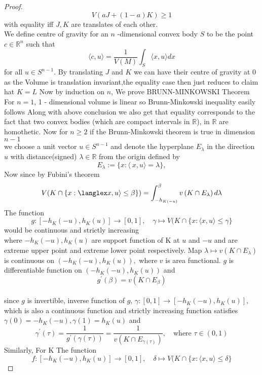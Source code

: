 \documentclass[oneside]{book}
\theoremstyle{definition}
\begin{document}
\begin{proof}
\[
V(a J+(1-a) K) \geq 1
\]
with equality iff $J, K$ are translates of each other.
\\
 We define centre of gravity for an $n$ -dimensional convex body $S$ to be the point $c \in \mathbb{R}^{n}$ such that
\[
\langle c, u\rangle=\frac{1}{V(M)} \int_{S}\langle x, u\rangle d x
\]
for all $u \in S^{n-1} .$ \newpage
By translating  $J$ and $K$ we can have their centre of gravity at 0 as the Volume is translation invariant,the equality case then just reduces to claim hat $K=L$
\hfill \break
Now by induction on $n$, We prove  BRUNN-MINKOWSKI Theorem 
\hfill \break
For $n=1$, 1 - dimensional volume is linear so Brunn-Minkowski inequality easily follows 
\hfill \break 
Along with above conclusion we also get that equality corresponds to the fact that two convex bodies (which are compact intervals in $\mathbb{R}$), in $\mathbb{R}$  are homothetic.
\hfill \break 
Now for $n \geq 2$ if the Brunn-Minkowski theorem is true in dimension $n-1 $
\\
we choose a unit vector $u \in S^{n-1}$ and denote 
the hyperplane $E_{\lambda}$ in the direction $u$ with  distance(signed) $\lambda \in \mathbb{R} $ from the origin defined by 
\[
E_{\lambda}:=\{x:\langle\ x, u\rangle=\lambda\}, 
\]
Now since by Fubini's theorem  
\[
V(K \cap\{x: \langlex x, u\rangle \leq \beta\})=\int_{-h_{ K(-u)}}^{\beta} v\left(K \cap E_{\lambda}\right) d \lambda
\] 
The function
\[
g:\left[-h_{K}(-u), h_{K}(u)\right] \rightarrow[0,1], \quad \gamma \mapsto V(K \cap\{x:\langle x, u\rangle \leq  \gamma \}
\]
would be  continuous and strictly increasing\\
where $-h_{K}(-u), h_{K}(u)$ are support function of K at $u$ and $-u$ and are extreme upper point and extreme lower point respectively.
\hfill \break
  Map $\lambda \mapsto v\left(K \cap E_{\lambda}\right)$ is continuous on $\left(-h_{K}(-u), h_{K}(u)\right),$ where $v$ is area functional.
   $g$ is differentiable function on $\left(-h_{K}(-u), h_{K}(u)\right)$ and $$g^{\prime}(\beta)=v\left(K \cap E_{\beta}\right)$$
  \\
  since $g$ is invertible, inverse function of $g$, $ \gamma:[0,1] \rightarrow\left[-h_{K}(-u), h_{K}(u)\right],$ which is also a continuous function and strictly increasing  function satisfies $ \gamma(0)=-h_{K}(-u),  \gamma(1)=h_{K}(u)$ and
\[
 \gamma^{\prime}(\tau)=\frac{1}{g^{\prime}( \gamma(\tau))}=\frac{1}{v\left(K \cap E_{ \gamma(\tau)}\right)}, \quad  \text{where } \tau \in(0,1)
\]
Similarly, For K
The function
\[
f:\left[-h_{K}(-u), h_{K}(u)\right] \rightarrow[0,1], \quad \delta \mapsto V(K \cap\{x:\langle x, u\rangle \leq  \delta \}
\]
\end{proof}
\end{document}
